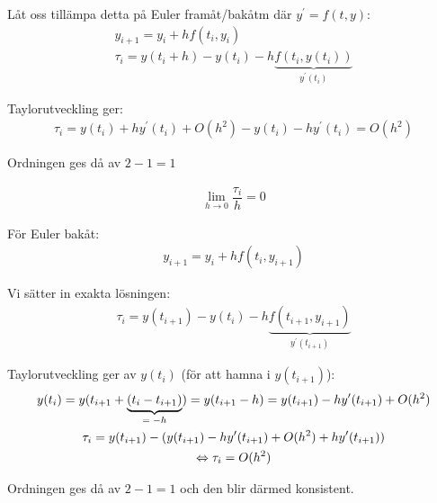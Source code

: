 \par\bigskip
\noindent Låt oss tillämpa detta på Euler framåt/bakåtm där $y^{\prime} = f(t,y)$:
\begin{equation*}
  \begin{gathered}
    y_{i+1} = y_i+hf(t_i,y_i)\\
  \tau_i = y(t_i+h)-y(t_i)-h \underbrace{f(t_i,y(t_i))
}_{\text{$y^{\prime}(t_i)$}}
\end{gathered}
\end{equation*}\par
\noindent Taylorutveckling ger:
\begin{equation*}
  \begin{gathered}
    \tau_i = y(t_i)+hy^{\prime}(t_i)+O(h^2) -y(t_i)-hy^{\prime}(t_i) = O(h^2)
  \end{gathered}
\end{equation*}\par
\noindent Ordningen ges då av $2-1 = 1$
\par\bigskip
\begin{equation*}
  \begin{gathered}
    \lim_{h\to 0}\dfrac{\tau_i}{h} = 0
  \end{gathered}
\end{equation*}
\par\bigskip
\noindent För Euler bakåt:
\begin{equation*}
  \begin{gathered}
    y_{i+1} = y_i+hf(t_i,y_{i+1})
  \end{gathered}
\end{equation*}\par
\noindent Vi sätter in exakta lösningen:
\begin{equation*}
  \begin{gathered}
    \tau_i = y(t_{i+1})-y(t_i)-h\underbrace{f(t_{i+1},y_{i+1})}_{\text{$y^{\prime}(t_{i+1})$}}
  \end{gathered}
\end{equation*}\par
\noindent Taylorutveckling ger av $y(t_i)$ (för att hamna i $y(t_{i+1})$):
\begin{equation*}
  \begin{gathered}
    y(t_i) = y(t_{i+1} + \underbrace{(t_i-t_{i+1})}_{\text{$=-h$}}) = y(t_{i+1}-h) = y(t_{i+1})-hy^{\prime}(t_{i+1})+O(h^2)\\
    \tau_i = y(t_{i+1})-(y(t_{i+1})-hy^{\prime}(t_{i+1})+O(h^2)+hy^{\prime}(t_{i+1}))\\
    \Leftrightarrow \tau_i = O(h^2)
  \end{gathered}
\end{equation*}\par
\noindent Ordningen ges då av $2-1=1$ och den blir därmed konsistent.
